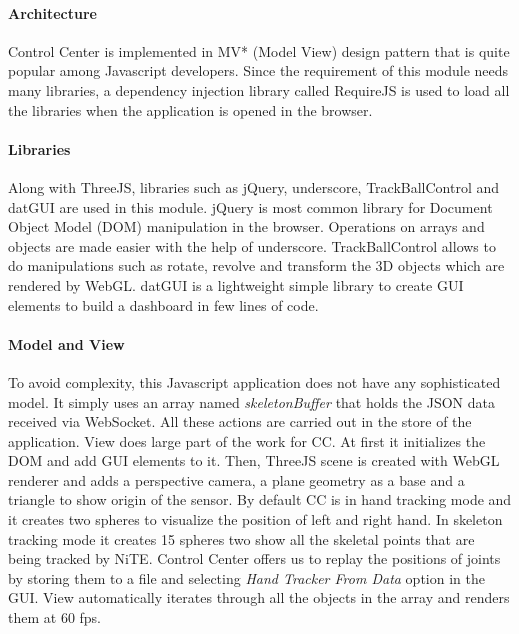 \paragraph*{Architecture} Control Center is implemented in MV* (Model View) design pattern that is quite popular among Javascript developers. Since the requirement of this module needs many libraries, a dependency injection library called RequireJS is used to load all the libraries when the application is opened in the browser. 

\paragraph*{Libraries} Along with ThreeJS, libraries such as jQuery, underscore, TrackBallControl and datGUI are used in this module. jQuery is most common library for Document Object Model (DOM) manipulation in the browser. Operations on arrays and objects are made easier with the help of underscore. TrackBallControl allows to do manipulations such as rotate, revolve and transform the 3D objects which are rendered by WebGL. datGUI is a lightweight simple library to create GUI elements to build a dashboard in few lines of code.



\paragraph*{Model and View} To avoid complexity, this Javascript application does not have any sophisticated model. It simply uses an array named \textit{skeletonBuffer} that holds the JSON data received via WebSocket. All these actions are carried out in the store of the application. View does large part of the work for CC. At first it initializes the DOM and add GUI elements to it. Then, ThreeJS scene is created with WebGL renderer and adds a perspective camera, a plane geometry as a base and a triangle to show origin of the sensor. By default CC is in hand tracking mode and it creates two spheres to visualize the position of left and right hand. In skeleton tracking mode it creates 15 spheres two show all the skeletal points that are being tracked by NiTE. Control Center offers us to replay the positions of joints by storing them to a file and selecting \textit{Hand Tracker From Data} option in the GUI. View automatically iterates through all the objects in the array and renders them at 60 fps. 

